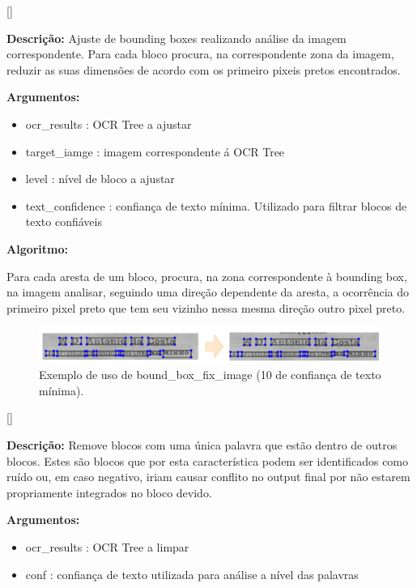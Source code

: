 [\normalsize]

\textbf{Descrição:} Ajuste de bounding boxes realizando análise da imagem correspondente. Para cada bloco procura, na correspondente zona da imagem, reduzir as suas dimensões de acordo com os primeiro pixeis pretos encontrados.

\textbf{Argumentos:}
\begin{itemize}\setlength\itemsep{-0.3em}
	\vspace{-0.5em}
	\item ocr\_results : OCR Tree a ajustar
	\item target\_iamge : imagem correspondente á OCR Tree
	\item level : nível de bloco a ajustar
	\item text\_confidence : confiança de texto mínima. Utilizado para filtrar blocos de texto confiáveis
\end{itemize}

\textbf{Algoritmo:}

Para cada aresta de um bloco, procura, na zona correspondente à bounding box, na imagem analisar, seguindo uma direção dependente da aresta, a ocorrência do primeiro pixel preto que tem seu vizinho nessa mesma direção outro pixel preto.


\begin{figure}[H]
	\centering
	\includegraphics[width=1\textwidth]{images/ilustracoes/bound_box_fix_image.png}
	\caption{Exemplo de uso de bound\_box\_fix\_image (10 de confiança de texto mínima).}
	\label{fig:bound_box_fix_image}
\end{figure}


[\normalsize]

\textbf{Descrição:} Remove blocos com uma única palavra que estão dentro de outros blocos. Estes são blocos que por esta característica podem ser identificados como ruído ou, em caso negativo, iriam causar conflito no output final por não estarem propriamente integrados no bloco devido.

\textbf{Argumentos:}
\begin{itemize}\setlength\itemsep{-0.3em}
	\vspace{-0.5em}
	\item ocr\_results : OCR Tree a limpar
	\item conf : confiança de texto utilizada para análise a nível das palavras
\end{itemize}


